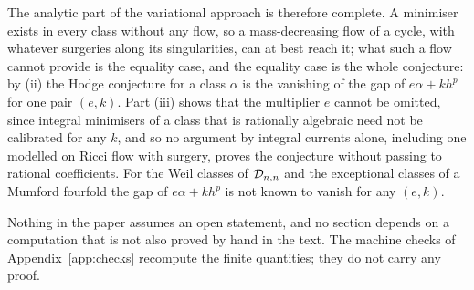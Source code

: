 The analytic part of the variational approach is therefore complete. A minimiser exists in every class without any flow, so a mass-decreasing flow of a cycle, with whatever surgeries along its singularities, can at best reach it; what such a flow cannot provide is the equality case, and the equality case is the whole conjecture: by (ii) the Hodge conjecture for a class $\alpha$ is the vanishing of the gap of $e\alpha+kh^{p}$ for one pair $(e,k)$. Part (iii) shows that the multiplier $e$ cannot be omitted, since integral minimisers of a class that is rationally algebraic need not be calibrated for any $k$, and so no argument by integral currents alone, including one modelled on Ricci flow with surgery, proves the conjecture without passing to rational coefficients. For the Weil classes of $\mathcal{D}_{n,n}$ and the exceptional classes of a Mumford fourfold the gap of $e\alpha+kh^{p}$ is not known to vanish for any $(e,k)$.

Nothing in the paper assumes an open statement, and no section depends on a computation that is not also proved by hand in the text. The machine checks of Appendix~\ref{app:checks} recompute the finite quantities; they do not carry any proof.
